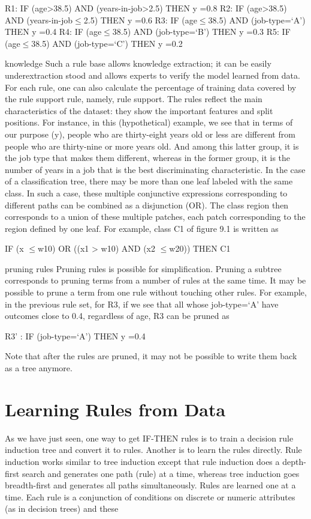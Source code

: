 R1: IF (age>38.5) AND (years-in-job>2.5) THEN y =0.8 R2: IF (age>38.5) AND (years-in-job$\leq$2.5) THEN y =0.6 R3: IF (age$\leq$38.5) AND (job-type=‘A’) THEN y =0.4 R4: IF (age$\leq$38.5) AND (job-type=‘B’) THEN y =0.3 R5: IF (age$\leq$38.5) AND (job-type=‘C’) THEN y =0.2

knowledge Such a rule base allows knowledge extraction; it can be easily underextraction stood and allows experts to verify the model learned from data. For each rule, one can also calculate the percentage of training data covered by the rule support rule, namely, rule support. The rules reflect the main characteristics of the dataset: they show the important features and split positions. For instance, in this (hypothetical) example, we see that in terms of our purpose (y), people who are thirty-eight years old or less are different from people who are thirty-nine or more years old. And among this latter group, it is the job type that makes them different, whereas in the former group, it is the number of years in a job that is the best discriminating characteristic. In the case of a classification tree, there may be more than one leaf labeled with the same class. In such a case, these multiple conjunctive expressions corresponding to different paths can be combined as a disjunction (OR). The class region then corresponds to a union of these multiple patches, each patch corresponding to the region defined by one leaf. For example, class C1 of figure 9.1 is written as

IF (x $\leq$w10) OR ((x1 > w10) AND (x2 $\leq$w20)) THEN C1

pruning rules Pruning rules is possible for simplification. Pruning a subtree corresponds to pruning terms from a number of rules at the same time. It may be possible to prune a term from one rule without touching other rules. For example, in the previous rule set, for R3, if we see that all whose job-type=‘A’ have outcomes close to 0.4, regardless of age, R3 can be pruned as

R3' : IF (job-type=‘A’) THEN y =0.4

Note that after the rules are pruned, it may not be possible to write them back as a tree anymore.

\section{Learning Rules from Data}

As we have just seen, one way to get IF-THEN rules is to train a decision rule induction tree and convert it to rules. Another is to learn the rules directly. Rule induction works similar to tree induction except that rule induction does a depth-first search and generates one path (rule) at a time, whereas tree induction goes breadth-first and generates all paths simultaneously. Rules are learned one at a time. Each rule is a conjunction of conditions on discrete or numeric attributes (as in decision trees) and these

